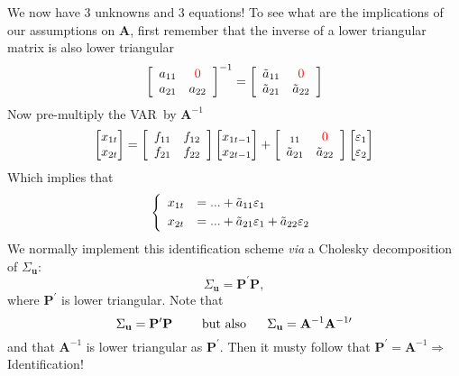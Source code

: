 \documentclass[11pt,a4paper]{report}
\numberwithin{equation}{chapter}
\numberwithin{section}{chapter}
\begin{document}
\noindent We now have 3 unknowns and 3 equations! To see what are the
implications of our assumptions on $\mathbf{A}$, first remember that the
inverse of a lower triangular matrix is also lower triangular%
\begin{equation*}
\left[ 
\begin{array}{cc}
a_{11} & {%
\color{red}%
{0}} \\ 
a_{21} & a_{22}%
\end{array}%
\right] ^{-1}=\left[ 
\begin{array}{cc}
\tilde{a}_{11} & {%
\color{red}%
{0}} \\ 
\tilde{a}_{21} & \tilde{a}_{22}%
\end{array}%
\right]
\end{equation*}%
Now pre-multiply the VAR\ by $\mathbf{A}^{-1}$%
\begin{equation*}
\begin{bmatrix}
x_{1t} \\ 
x_{2t}%
\end{bmatrix}%
=\left[ 
\begin{array}{cc}
f_{11} & f_{12} \\ 
f_{21} & f_{22}%
\end{array}%
\right] 
\begin{bmatrix}
x_{1t-1} \\ 
x_{2t-1}%
\end{bmatrix}%
+\left[ 
\begin{array}{cc}
_{11} & {%
\color{red}%
{0}} \\ 
\tilde{a}_{21} & \tilde{a}_{22}%
\end{array}%
\right]%
\begin{bmatrix}
\varepsilon _{1} \\ 
\varepsilon _{2}%
\end{bmatrix}%
\end{equation*}%
Which implies that 
\begin{equation*}
\left\{ 
\begin{array}{ll}
x_{1t} & =...+\tilde{a}_{11}\varepsilon _{1}\smallskip \\ 
x_{2t} & =...+\tilde{a}_{21}\varepsilon _{1}+\tilde{a}_{22}\varepsilon _{2}%
\end{array}%
\right.
\end{equation*}%
We normally implement this identification scheme \emph{via} a {Cholesky
decomposition} of $\Sigma _{\mathbf{u}}$:%
\begin{equation*}
\Sigma _{\mathbf{u}}=\mathbf{P}^{\prime }\mathbf{P,}
\end{equation*}%
where $\mathbf{P}^{\prime }$ is lower triangular. Note that%
\begin{equation*}
\Sigma _{\mathbf{u}}=\mathbf{P}^{\prime }\mathbf{P}\text{ \ \ \ \ but also \
\ \ \ }\Sigma _{\mathbf{u}}=\mathbf{A}^{-1}\mathbf{A}^{-1\prime }
\end{equation*}%
and that $\mathbf{A}^{-1}$ is lower triangular as $\mathbf{P}^{\prime }$.
Then it musty follow that $\mathbf{P}^{\prime }\mathbf{=A}%
^{-1}\Longrightarrow $ Identification!
\end{document}
